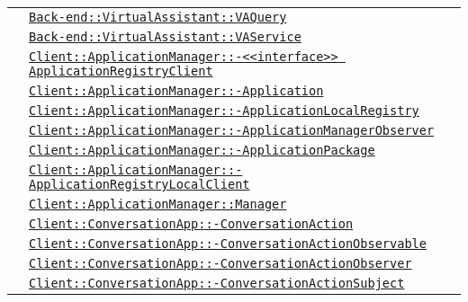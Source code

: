 \begin{longtable}{|>{\centering}m{3cm}|m{10cm}<{\centering}|}
& \hyperref[Back-end::VirtualAssistant::VAQuery]{\texttt{Back-end::VirtualAssistant::VAQuery}}\\
& \hyperref[Back-end::VirtualAssistant::VAService]{\texttt{Back-end::VirtualAssistant::VAService}}\\
& \hyperref[Client::ApplicationManager::<<interface>> ApplicationRegistryClient]{\texttt{Client::ApplicationManager::-\linebreak <<interface>> ApplicationRegistryClient}}\\
& \hyperref[Client::ApplicationManager::Application]{\texttt{Client::ApplicationManager::-\linebreak Application}}\\
& \hyperref[Client::ApplicationManager::ApplicationLocalRegistry]{\texttt{Client::ApplicationManager::-\linebreak ApplicationLocalRegistry}}\\
& \hyperref[Client::ApplicationManager::ApplicationManagerObserver]{\texttt{Client::ApplicationManager::-\linebreak ApplicationManagerObserver}}\\
& \hyperref[Client::ApplicationManager::ApplicationPackage]{\texttt{Client::ApplicationManager::-\linebreak ApplicationPackage}}\\
& \hyperref[Client::ApplicationManager::ApplicationRegistryLocalClient]{\texttt{Client::ApplicationManager::-\linebreak ApplicationRegistryLocalClient}}\\
& \hyperref[Client::ApplicationManager::Manager]{\texttt{Client::ApplicationManager::Manager}}\\
& \hyperref[Client::ConversationApp::ConversationAction]{\texttt{Client::ConversationApp::-\linebreak ConversationAction}}\\
& \hyperref[Client::ConversationApp::ConversationActionObservable]{\texttt{Client::ConversationApp::-\linebreak ConversationActionObservable}}\\
& \hyperref[Client::ConversationApp::ConversationActionObserver]{\texttt{Client::ConversationApp::-\linebreak ConversationActionObserver}}\\
& \hyperref[Client::ConversationApp::ConversationActionSubject]{\texttt{Client::ConversationApp::-\linebreak ConversationActionSubject}}\\

\end{longtable}
